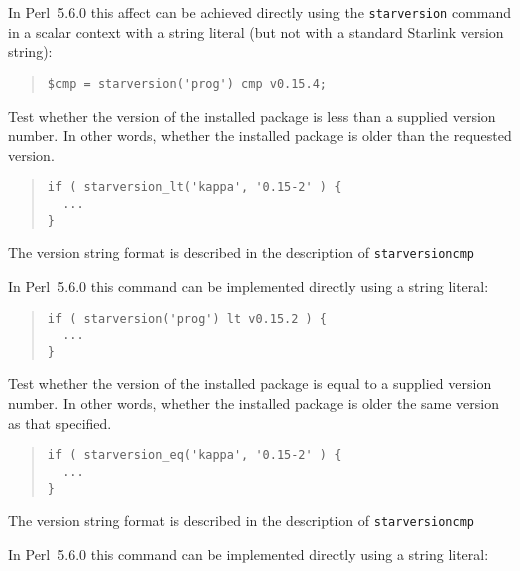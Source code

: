 \documentclass[twoside,11pt]{article}
\newenvironment{myquote}{\begin{quote}\begin{small}}{\end{small}\end{quote}}
\newcommand{\perl}{\xref{\textsf{Perl}}{sun193}{}}
\newcommand{\xref}[3]{#1}
\renewcommand{\_}{\texttt{\symbol{95}}}
\begin{document}
\begin{description}
In \perl\ 5.6.0 this affect can be achieved directly using
the \texttt{starversion} command in a scalar context with a string literal
(but not with a standard Starlink version string):

\begin{myquote}
\begin{verbatim}
$cmp = starversion('prog') cmp v0.15.4;
\end{verbatim} 
\end{myquote} %

\item[starversion\_lt] \mbox{}
  
  Test whether the version of the installed package is less than a supplied
  version number. In other words, whether the installed package is older than
  the requested version.

\begin{myquote}
\begin{verbatim}
if ( starversion_lt('kappa', '0.15-2' ) {
  ...
}
\end{verbatim}
\end{myquote}

The version string format is described in the description of
\texttt{starversion\_cmp}



In \perl\ 5.6.0 this command can be implemented directly using a string literal:

\begin{myquote}
\begin{verbatim}
if ( starversion('prog') lt v0.15.2 ) {
  ...
}
\end{verbatim}
\end{myquote}

\item[starversion\_eq] \mbox{}

Test whether the version of the installed package is equal to a supplied
version number. In other words, whether the installed package is older the
same version as that specified.

\begin{myquote}
\begin{verbatim}
if ( starversion_eq('kappa', '0.15-2' ) {
  ...
}
\end{verbatim}
\end{myquote}

The version string format is described in the description of
\texttt{starversion\_cmp}



In \perl\ 5.6.0 this command can be implemented directly using a string literal:


\end{description}
\end{document}
